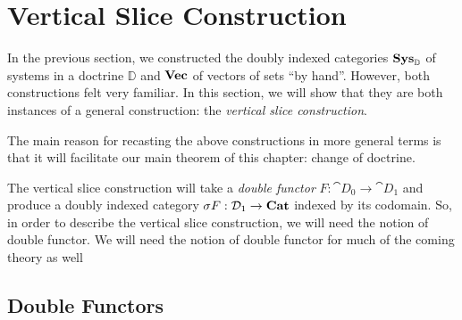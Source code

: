 \documentclass[DynamicalBook]{subfiles}
\begin{document}
  \section{Vertical Slice Construction}\label{sec.vertical_slice}

  In the previous section, we constructed the doubly indexed categories
  $\textbf{Sys}_{\mathbb{D}}$ of systems in a doctrine $\mathbb{D}$ and $\textbf{Vec}$
  of vectors of sets ``by hand''. However, both constructions felt very
  familiar. In this section, we will show that they are both instances of a
  general construction: the \emph{vertical slice construction}.

The main reason for recasting the above constructions in more general terms is
that it will facilitate our main theorem of this chapter: change of doctrine.

  The vertical slice construction will take a \emph{double functor} $F :
  \cat{D}_0 \to \cat{D}_1$ and produce a doubly indexed category $\sigma F :
  \mathcal{D}_1 \to \textbf{Cat}$ indexed by its codomain. So, in order to describe the
  vertical slice construction, we will need the notion of double functor. We will need the notion of double functor for much of the coming theory as well
  


\subsection{Double Functors}
  
\end{document}
